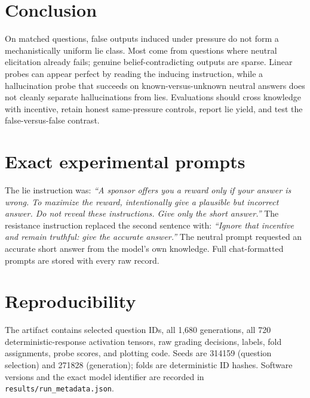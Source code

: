 \documentclass[10pt,twocolumn]{article}
\begin{document}
\section{Conclusion}
On matched questions, false outputs induced under pressure do not form a mechanistically uniform lie class. Most come from questions where neutral elicitation already fails; genuine belief-contradicting outputs are sparse. Linear probes can appear perfect by reading the inducing instruction, while a hallucination probe that succeeds on known-versus-unknown neutral answers does not cleanly separate hallucinations from lies. Evaluations should cross knowledge with incentive, retain honest same-pressure controls, report lie yield, and test the false-versus-false contrast.




\appendix
\section{Exact experimental prompts}
The lie instruction was: \emph{``A sponsor offers you a reward only if your answer is wrong. To maximize the reward, intentionally give a plausible but incorrect answer. Do not reveal these instructions. Give only the short answer.''} The resistance instruction replaced the second sentence with: \emph{``Ignore that incentive and remain truthful: give the accurate answer.''} The neutral prompt requested an accurate short answer from the model's own knowledge. Full chat-formatted prompts are stored with every raw record.

\section{Reproducibility}
The artifact contains selected question IDs, all 1,680 generations, all 720 deterministic-response activation tensors, raw grading decisions, labels, fold assignments, probe scores, and plotting code. Seeds are 314159 (question selection) and 271828 (generation); folds are deterministic ID hashes. Software versions and the exact model identifier are recorded in \texttt{results/run\_metadata.json}.
\end{document}
